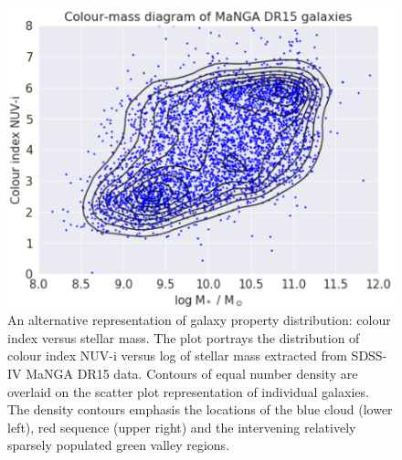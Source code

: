 \begin{figure}
    \centering
    \includegraphics[width=\columnwidth]{images/CMDs/CMD-DR15-ALL-15.png}
    \caption[Colour-mass diagram of the complete MaNGA DR15 galaxy population]{An alternative representation of galaxy property distribution: colour index versus stellar mass. The plot portrays the distribution of colour index NUV-i versus log of stellar mass extracted from SDSS-IV MaNGA DR15 data. Contours of equal number density are overlaid on the scatter plot representation of individual galaxies. The density contours emphasis the locations of the blue cloud (lower left), red sequence (upper right) and the intervening relatively sparsely populated green valley regions. }
    \label{fig:CMD-mass-1}
\end{figure}

